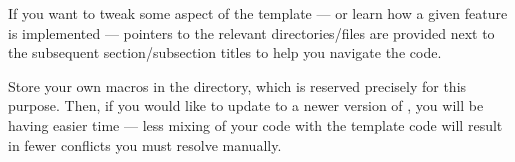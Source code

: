 \begin{figure}[!ht]
{%
    }
\end{figure}

\begin{remark}
    If you want to tweak some aspect of the template --- or learn how a given feature is implemented --- pointers to the relevant directories/files are provided next to the subsequent section/subsection titles to help you navigate the code.
\end{remark}

\begin{remark}
    Store your own macros in the  directory, which is reserved precisely for this purpose.
    Then, if you would like to update to a newer version of \TeXtured{}, you will be having easier time --- less mixing of your code with the template code will result in fewer conflicts you must resolve manually.
\end{remark}

